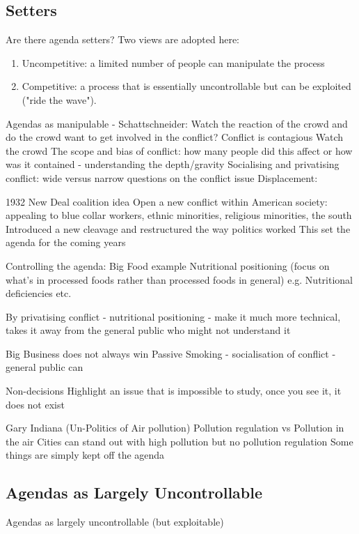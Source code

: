 \documentclass[12pt, letterpaper]{article}
\begin{document}
{\subsection{Setters}
Are there agenda setters?
Two views are adopted here:
\begin{enumerate}
	\item Uncompetitive: a limited number of people can manipulate the process
	\item Competitive: a process that is essentially uncontrollable but can be exploited ("ride the wave").
\end{enumerate}

Agendas as manipulable - Schattschneider: Watch the reaction of the crowd and do the crowd want to get involved in the conflict?
Conflict is contagious
Watch the crowd
The scope and bias of conflict: how many people did this affect or how was it contained - understanding the depth/gravity
Socialising and privatising conflict: wide versus narrow questions on the conflict issue
Displacement:

1932 New Deal coalition idea
Open a new conflict within American society: appealing to blue collar workers, ethnic minorities, religious minorities, the south
Introduced a new cleavage and restructured the way politics worked
This set the agenda for the coming years

Controlling the agenda: Big Food example
Nutritional positioning (focus on what's in processed foods rather than processed foods in general)
e.g. Nutritional deficiencies etc.

By privatising conflict - nutritional positioning - make it much more technical, takes it away from the general public who might not understand it

Big Business does not always win
Passive Smoking - socialisation of conflict - general public can 

Non-decisions
Highlight an issue that is impossible to study, once you see it, it does not exist

Gary Indiana (Un-Politics of Air pollution)
Pollution regulation vs Pollution in the air
Cities can stand out with high pollution but no pollution regulation
Some things are simply kept off the agenda

\subsection{Agendas as Largely Uncontrollable}
Agendas as largely uncontrollable (but exploitable)

}
\end{document}
